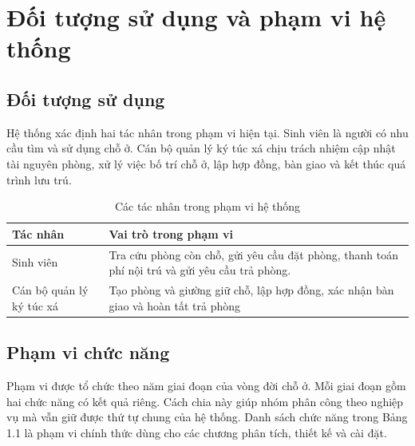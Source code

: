 \section{Đối tượng sử dụng và phạm vi hệ thống}

\subsection{Đối tượng sử dụng}

Hệ thống xác định hai tác nhân trong phạm vi hiện tại. Sinh viên là người có nhu cầu tìm và sử dụng chỗ ở. Cán bộ quản lý ký túc xá chịu trách nhiệm cập nhật tài nguyên phòng, xử lý việc bố trí chỗ ở, lập hợp đồng, bàn giao và kết thúc quá trình lưu trú.

\begin{table}[H]
\centering
\small
\caption{Các tác nhân trong phạm vi hệ thống}
\label{tab:ch1-1}
\begin{tabularx}{\textwidth}{|>{\raggedright\arraybackslash}p{}|>{\raggedright\arraybackslash}X|}
\hline
\textbf{Tác nhân} & \textbf{Vai trò trong phạm vi} \\
\hline
Sinh viên & Tra cứu phòng còn chỗ, gửi yêu cầu đặt phòng, thanh toán phí nội trú và gửi yêu cầu trả phòng. \\
\hline
Cán bộ quản lý ký túc xá & Tạo phòng và giường giữ chỗ, lập hợp đồng, xác nhận bàn giao và hoàn tất trả phòng \\
\hline
\end{tabularx}
\end{table}

\subsection{Phạm vi chức năng}

Phạm vi được tổ chức theo năm giai đoạn của vòng đời chỗ ở. Mỗi giai đoạn gồm hai chức năng có kết quả riêng. Cách chia này giúp nhóm phân công theo nghiệp vụ mà vẫn giữ được thứ tự chung của hệ thống. Danh sách chức năng trong Bảng 1.1 là phạm vi chính thức dùng cho các chương phân tích, thiết kế và cài đặt.

